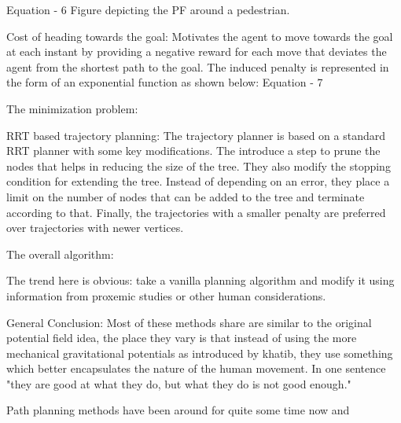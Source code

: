 Equation - 6
Figure depicting the PF around a pedestrian.

Cost of heading towards the goal:
Motivates the agent to move towards the goal at each instant by providing a  negative reward for each move that deviates the agent from the shortest path to the goal. The induced penalty is represented in the form of an exponential function as shown below:
Equation - 7

The minimization problem:

RRT based trajectory planning:
The trajectory planner is based on a standard RRT planner with some key modifications. The introduce a step to prune the nodes that helps in reducing the size of the tree. They also modify the stopping condition for extending the tree. Instead of depending on an error, they place a limit on the number of nodes that can be added to the tree and terminate according to that. Finally, the trajectories with a smaller penalty are preferred over trajectories with newer vertices.

The overall algorithm:

The trend here is obvious: take a vanilla planning algorithm and modify it using information from proxemic studies or other human considerations.

General Conclusion:
Most of these methods share are similar to the original potential field idea, the place they vary is that instead of using the more mechanical gravitational potentials as introduced by khatib, they use something which better encapsulates the nature of the human movement.
In one sentence "they are good at what they do, but what they do is not good enough."

Path planning methods have been around for quite some time now and 


